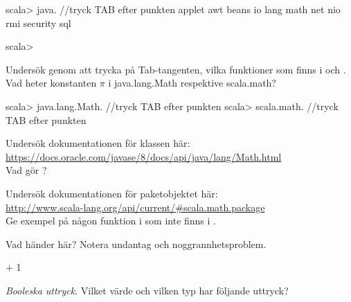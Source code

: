 {{{{{\begin{REPL}
scala> java.    //tryck TAB efter punkten
applet   awt   beans   io   lang   math   net   nio   rmi   security   sql

scala>
\end{REPL}

\Subtask Undersök genom att trycka på Tab-tangenten, vilka funktioner som finns i  och . Vad heter konstanten $\pi$ i java.lang.Math respektive scala.math?

\begin{REPL}
scala> java.lang.Math.    //tryck TAB efter punkten
scala> scala.math.        //tryck TAB efter punkten
\end{REPL}

\Subtask Undersök dokumentationen för klassen  här: \\ \url{https://docs.oracle.com/javase/8/docs/api/java/lang/Math.html} \\
Vad gör ?

\Subtask Undersök dokumentationen för paketobjektet  här: \\
\url{http://www.scala-lang.org/api/current/#scala.math.package} \\
Ge exempel på någon funktion i  som inte finns i .


\Task Vad händer här? Notera undantag  och noggrannhetsproblem. %

\Subtask {} + 1

\Subtask {}

\Subtask {}

\Subtask {}

\Subtask {}

\Subtask {}

\Subtask {}

\Subtask {}

\Subtask {}

\Subtask {}


\Task \textit{Booleska uttryck}. Vilket värde och vilken typ har följande uttryck?  %

\Subtask {}

}}}}}
